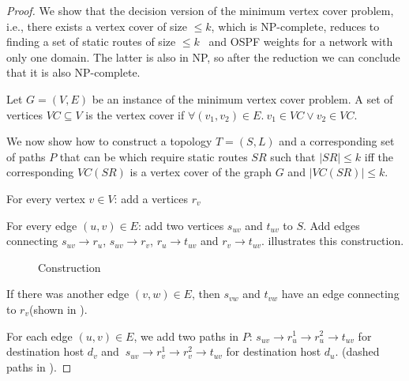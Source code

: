 \begin{proof}
We show that the decision version of the minimum 
vertex cover problem, i.e., there exists a vertex cover
of size $ \leq k$, which is NP-complete, 
reduces to finding a set of static routes 
of size $ \leq k$ \
and OSPF weights for a network with only one domain. 
The latter is also in NP, so after the reduction we 
can conclude that it is also NP-complete.

Let $G = (V,E)$ be an instance of the 
minimum vertex cover problem. A set of
vertices $VC \subseteq V$ is the vertex cover
if $\forall (v_1, v_2) \in E. ~v_1 \in VC \vee v_2 \in VC$. 

We now show how to construct a topology $T=(S,L)$ 
and a corresponding set of paths $P$ that can be 
which require static routes $SR$ such that $|SR| \leq k$  
iff the corresponding $VC(SR)$ is a vertex cover of 
the graph $G$ and $|VC(SR)| \leq k$.

For every vertex $v \in V$: add a vertices $r_v$ 

For every edge $(u,v) \in E$: add two vertices $s_{uv}$
and $t_{uv}$ to $S$. Add edges
connecting $s_{uv} \rightarrow r_{u}$, $s_{uv} \rightarrow r_{v}$,
$r_{u} \rightarrow t_{uv}$ and $r_{v} \rightarrow t_{uv}$. 
 illustrates this construction.
\begin{figure}[H]
	\centering
	\caption{Construction}
	\label{fig:rfcomplexity}
\end{figure}
If there was another edge $(v,w) \in E$, then
$s_{vw}$ and $t_{vw}$ have an edge connecting to $r_v$(shown
in ). 

For each edge $(u,v) \in E$, we add two paths in $P$: 
$s_{uv} \rightarrow r_u^1 \rightarrow r_u^2 \rightarrow t_{uv}$
for destination host $d_v$ and 
$~s_{uv} \rightarrow r_v^1 \rightarrow r_v^2 \rightarrow t_{uv}$ 
for destination host $d_u$.
(dashed paths in ). 


\end{proof}
